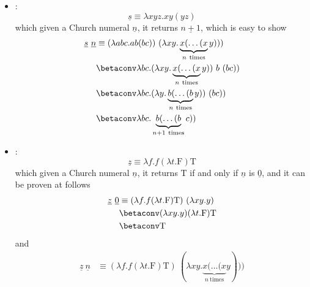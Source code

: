 \documentclass[a4paper, 12pt]{report}
\begin{document}
    \begin{itemize}
        \item {}: $$\underline s \equiv \lambda xyz. xy(yz)$$ which given a Church numeral $\underline n$, it returns $\underline {n + 1}$, which is easy to show
            \begin{equation*}
                \begin{split}
                    \underline s \ \underline n &\equiv (\lambda abc.ab(bc)) \ (\lambda xy. \underbrace{x ( \ldots ( x}_{n \ \mathrm{times}}y))) \\
                                              &\betaconv \lambda bc.(\lambda xy. \underbrace{x ( \ldots ( x}_{n \ \mathrm{times}}y)) \ b \ (bc)) \\
                                              &\betaconv \lambda bc. (\lambda y. \underbrace{b ( \ldots ( b}_{n \ \mathrm{times}}y)) \ (bc)) \\
                                              &\betaconv \lambda bc. \underbrace{b ( \ldots ( b}_{n +1 \ \mathrm{times}} c)) \\
                \end{split}
            \end{equation*}
        \item {}: $$\underline z \equiv \lambda f.f(\lambda t.\mathrm F) \mathrm T$$ which given a Church numeral $\underline n$, it returns $\mathrm T$ if and only if $\underline n$ is $\underline 0$, and it can be proven at follows
            \begin{equation*}
                \begin{split}
                    \underline z \ \underline 0 &\equiv (\lambda f.f(\lambda t.\mathrm F) \mathrm T) \ (\lambda xy.y) \\
                                                &\betaconv (\lambda xy.y) (\lambda t.\mathrm F) \mathrm T \\
                                                &\betaconv \mathrm T
                \end{split}
            \end{equation*}
            and
            \begin{equation*}
                \begin{split}
                    \underline z \ \underline n &\equiv (\lambda f.f(\lambda t.\mathrm F) \mathrm T) \ (\lambda xy. \underbrace{x ( \ldots ( x}_{n \ \mathrm{times}}y))) \\

\end{split}
\end{equation*}
\end{itemize}
\end{document}
